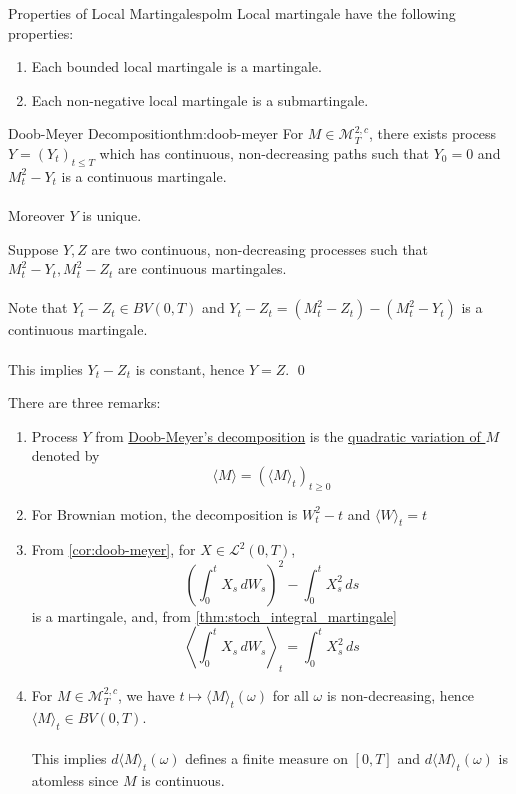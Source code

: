\documentclass[12pt,a4paper]{article}
\renewenvironment{proof}
    {\begin{trivlist}\item[\hskip\labelsep\color{blue}\bfseries Proof:]}
    {\qed\end{trivlist}}
\begin{document}
\pagebreak
\begin{proposition}{Properties of Local Martingales}{polm} Local martingale have the following properties:
    \begin{enumerate}
        \item[1)] Each bounded local martingale is a martingale.
        \item[2)] Each non-negative local martingale is a submartingale.
    \end{enumerate}
\end{proposition}
\pagebreak
\begin{theorem}{Doob-Meyer Decomposition}{thm:doob-meyer}
For $M\in\mathcal{M}^{2,c}_T$, there exists process $Y = (Y_t)_{t\le T}$ which has continuous, non-decreasing paths such that $Y_0=0$ and $M_t^2-Y_t$ is a continuous martingale.\\
\\
Moreover $Y$ is unique.
\end{theorem}
\begin{proof}[Uniqueness] Suppose $Y, Z$ are two continuous, non-decreasing processes such that $M_t^2-Y_t, M_t^2-Z_t$ are continuous martingales.\\
\\
Note that $Y_t-Z_t\in BV(0,T)$ and $Y_t-Z_t = (M_t^2-Z_t)-(M_t^2-Y_t)$ is a continuous martingale.\\
\\
This implies $Y_t-Z_t$ is constant, hence $Y=Z$.
\end{proof}
\begin{remark}{}{}There are three remarks:
\begin{enumerate}
    \item[1)] Process $Y$ from \hyperref[thm:doob-meyer]{Doob-Meyer's decomposition} is the \underline{quadratic variation of $M$} denoted by 
    $$
    \langle M\rangle = (\langle M\rangle_t)_{t\ge 0}
    $$
    \item[2)] For Brownian motion, the decomposition is $W_t^2-t$ and $\langle W\rangle_t =t$
    \item[3)] From \autoref{cor:doob-meyer}, for $X\in \mathcal{L}^2(0,T)$,
    $$
    \left(\int_0^t X_s\,dW_s\right)^2 - \int_0^t X_s^2 \,ds
    $$
    is a martingale, and, from \autoref{thm:stoch_integral_martingale}
    $$
    \left\langle\int_0^t X_s\,dW_s\right\rangle_t = \int_0^t X_s^2\,ds
    $$
    \item[4)] For $M\in\mathcal{M}^{2,c}_T$, we have $t\mapsto \langle M\rangle_t(\omega)$ for all $\omega$ is non-decreasing, hence $\langle M\rangle_t\in BV(0,T)$.\\
    \\
    This implies $d\langle M\rangle_t(\omega)$ defines a finite measure on $[0,T]$ and $d\langle M\rangle_t(\omega)$ is atomless since $M$ is continuous.
\end{enumerate}
\end{remark}
\end{document}
